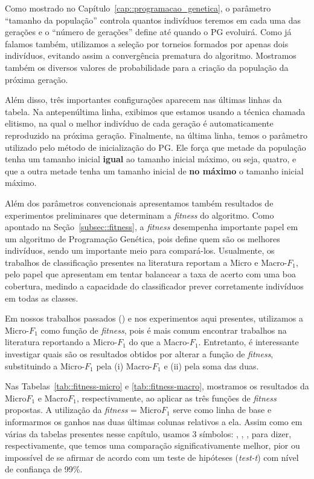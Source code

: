 Como mostrado no Capítulo~\ref{cap::programacao_genetica}, o parâmetro ``tamanho da população'' controla quantos indivíduos teremos em cada uma das gerações e o ``número de gerações'' define até quando o \textsc{PG} evoluirá. Como já falamos também, utilizamos a seleção por torneios formados por apenas dois indivíduos, evitando assim a convergência prematura do algoritmo.
Mostramos também os diversos valores de probabilidade para a criação da população da próxima geração. 

Além disso, três importantes configurações aparecem nas últimas linhas da tabela. Na antepenúltima linha, exibimos que estamos usando a técnica chamada elitismo, na qual o melhor indivíduo de cada geração é automaticamente reproduzido na próxima geração. Finalmente, na última linha, temos o parâmetro utilizado pelo método de inicialização do \textsc{PG}. Ele força que metade da população tenha um tamanho inicial \textbf{igual} ao tamanho inicial máximo, ou seja, quatro, e que a outra metade tenha um tamanho inicial de \textbf{no máximo} o tamanho inicial máximo.


Além dos parâmetros convencionais apresentamos também resultados de experimentos preliminares que determinam a \textit{fitness} do algoritmo.
Como apontado na Seção~\ref{subsec::fitness}, a \textit{fitness} desempenha importante papel em um algoritmo de Programação Genética, pois define quem são os melhores indivíduos, sendo um importante meio para compará-los.
Usualmente, os trabalhos de classificação presentes na literatura reportam a Micro e Macro-$F_1$, pelo papel que apresentam em tentar balancear a taxa de acerto com uma boa cobertura, medindo a capacidade do classificador prever corretamente indivíduos em todas as classes.

Em nossos trabalhos passados (\cite{Palotti10,Palotti11})
e nos experimentos aqui presentes, utilizamos a Micro-$F_1$ como função de \textit{fitness}, pois é mais comum encontrar trabalhos na literatura reportando a Micro-$F_1$ do que a Macro-$F_1$. Entretanto, é interessante investigar quais são os resultados obtidos por alterar a função de \textit{fitness}, substituindo a Micro-$F_1$ pela (i) Macro-$F_1$ e (ii) pela soma das duas.

Nas Tabelas~\ref{tab::fitness-micro} e \ref{tab::fitness-macro}, mostramos os resultados da Micro$F_1$ e Macro$F_1$, respectivamente, ao aplicar as três funções de \textit{fitness} propostas.
A utilização da \textit{fitness} = Micro$F_1$ serve como linha de base e informarmos os ganhos nas duas últimas colunas relativos a ela.
Assim como em várias da tabelas presentes nesse capítulo, usamos 3 símbolos: \triangOK, \triangBAD, \ball, para dizer, respectivamente, que temos uma comparação significativamente melhor, pior ou impossível de se afirmar de acordo com um teste de hipóteses (\textit{test-t}) com nível de confiança de 99\%.

